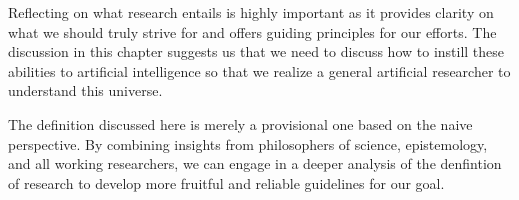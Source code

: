 \documentclass{book}
\begin{document}
Reflecting on what research entails is highly important as it provides clarity on what we should truly strive for and offers guiding principles for our efforts. The discussion in this chapter suggests us that we need to discuss how to instill these abilities to artificial intelligence so that we realize a general artificial researcher to understand this universe.

The definition discussed here is merely a provisional one based on the naive perspective. By combining insights from philosophers of science, epistemology, and all working researchers, we can engage in a deeper analysis of the denfintion of research to develop more fruitful and reliable guidelines for our goal.


\end{document}
